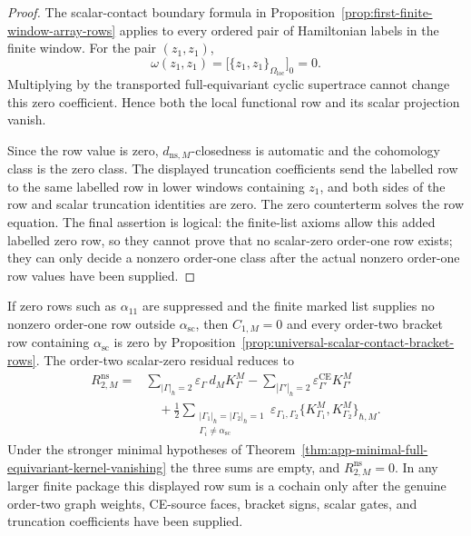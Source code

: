 \begin{proof}
  The scalar-contact boundary formula in
  Proposition~\ref{prop:first-finite-window-array-rows} applies to every
  ordered pair of Hamiltonian labels in the finite window.  For the pair
  \((z_1,z_1)\),
  \[
    \omega(z_1,z_1)
      =
    \bigl[\{z_1,z_1\}_{\Omega_{\mathrm{loc}}}\bigr]_0=0.
  \]
  Multiplying by the transported full-equivariant cyclic supertrace cannot
  change this zero coefficient.  Hence both the local functional row and
  its scalar projection vanish.

  Since the row value is zero, \(d_{\mathrm{ns},M}\)-closedness is
  automatic and the cohomology class is the zero class.  The displayed
  truncation coefficients send the labelled row to the same labelled row in
  lower windows containing \(z_1\), and both sides of the row and scalar
  truncation identities are zero.  The zero counterterm solves the row
  equation.  The final assertion is logical: the finite-list axioms allow
  this added labelled zero row, so they cannot prove that no scalar-zero
  order-one row exists; they can only decide a nonzero order-one class after
  the actual nonzero order-one row values have been supplied.
\end{proof}

\begin{rmk}
\label{rmk:app-order-two-after-no-nonzero-order-one-row}
  If zero rows such as \(\alpha_{11}\) are suppressed and the finite marked
  list supplies no nonzero order-one row outside
  \(\alpha_{\mathrm{sc}}\), then \(C_{1,M}=0\) and every order-two bracket
  row containing \(\alpha_{\mathrm{sc}}\) is zero by
  Proposition~\ref{prop:universal-scalar-contact-bracket-rows}.  The
  order-two scalar-zero residual reduces to
  \[
  \begin{aligned}
    R^{\mathrm{ns}}_{2,M}
      ={}&
      \sum_{|\Gamma|_\hbar=2}
        \varepsilon_\Gamma\,d_M K^M_\Gamma
      -\sum_{|\Gamma'|_\hbar=2}
        \varepsilon^{\mathrm{CE}}_{\Gamma'}K^M_{\Gamma'}  \\
      &\quad
      +\frac12
      \sum_{\substack{|\Gamma_1|_\hbar=|\Gamma_2|_\hbar=1\\
        \Gamma_i\neq\alpha_{\mathrm{sc}}}}
        \varepsilon_{\Gamma_1,\Gamma_2}
        \bigl\{K^M_{\Gamma_1},K^M_{\Gamma_2}\bigr\}_{\hbar,M}.
  \end{aligned}
  \]
  Under the stronger minimal hypotheses of
  Theorem~\ref{thm:app-minimal-full-equivariant-kernel-vanishing} the
  three sums are empty, and \(R^{\mathrm{ns}}_{2,M}=0\).  In any larger
  finite package this displayed row sum is a cochain only after the
  genuine order-two graph weights, CE-source faces, bracket signs, scalar
  gates, and truncation coefficients have been supplied.
\end{rmk}


